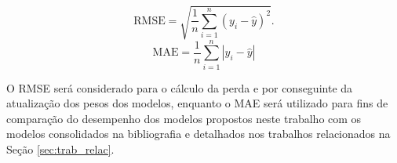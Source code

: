 \begin{equation}\label{eq:rmse}
     \textrm{RMSE} = \sqrt{\frac{1}{n} \sum_{i=1}^n (y_i - \hat{y})^2}.
\end{equation}
\begin{equation}\label{eq:mae}
     \textrm{MAE} = \frac{1}{n}\sum_{i=1}^{n} |y_i - \hat{y}|
\end{equation}

O RMSE será considerado para o cálculo da perda e por conseguinte da atualização dos pesos dos modelos, enquanto o MAE será utilizado para fins de comparação do desempenho dos modelos propostos neste trabalho com os modelos consolidados na bibliografia e detalhados nos trabalhos relacionados na Seção \ref{sec:trab_relac}.
